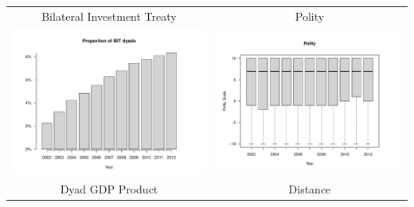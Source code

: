 \documentclass[reqno,onecolumn,letterpaper,12pt]{article}
\begin{document}
\begin{longtable}{c@{\hskip -.4cm}c}
Bilateral Investment Treaty &
Polity\\
\includegraphics[height=.2\textheight, clip=true, trim=0cm 1cm 0cm 1.6cm]{draft_figures/descriptive_plots/BIT.pdf}    &
\includegraphics[height=.2\textheight, clip=true, trim =1cm 1cm 0cm 1.6cm]{draft_figures/descriptive_plots/Polity.pdf}   \\
Dyad GDP Product &
Distance\\

\end{longtable}
\end{document}
